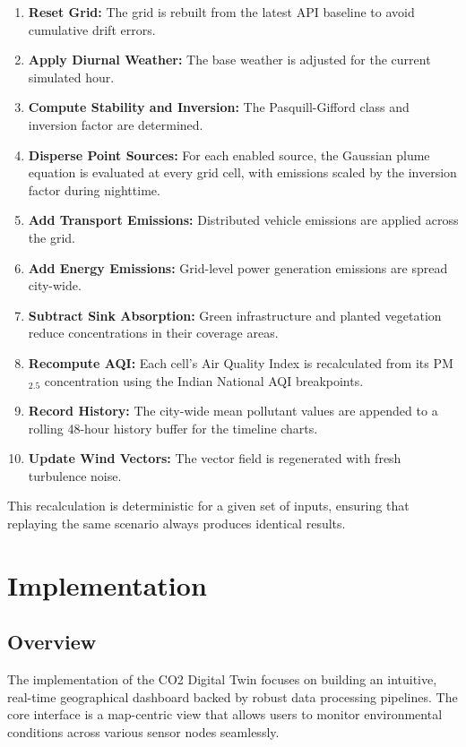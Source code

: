 \documentclass[a4paper, 12pt]{report}
\begin{document}
\begin{enumerate}
\item \textbf{Reset Grid:} The grid is rebuilt from the latest API baseline to avoid cumulative drift errors.
\item \textbf{Apply Diurnal Weather:} The base weather is adjusted for the current simulated hour.
\item \textbf{Compute Stability and Inversion:} The Pasquill-Gifford class and inversion factor are determined.
\item \textbf{Disperse Point Sources:} For each enabled source, the Gaussian plume equation is evaluated at every grid cell, with emissions scaled by the inversion factor during nighttime.
\item \textbf{Add Transport Emissions:} Distributed vehicle emissions are applied across the grid.
\item \textbf{Add Energy Emissions:} Grid-level power generation emissions are spread city-wide.
\item \textbf{Subtract Sink Absorption:} Green infrastructure and planted vegetation reduce concentrations in their coverage areas.
\item \textbf{Recompute AQI:} Each cell's Air Quality Index is recalculated from its PM$_{2.5}$ concentration using the Indian National AQI breakpoints.
\item \textbf{Record History:} The city-wide mean pollutant values are appended to a rolling 48-hour history buffer for the timeline charts.
\item \textbf{Update Wind Vectors:} The vector field is regenerated with fresh turbulence noise.
\end{enumerate}

This recalculation is deterministic for a given set of inputs, ensuring that replaying the same scenario always produces identical results.

\chapter{Implementation}
\section{Overview}
The implementation of the CO2 Digital Twin focuses on building an intuitive, real-time geographical dashboard backed by robust data processing pipelines. The core interface is a map-centric view that allows users to monitor environmental conditions across various sensor nodes seamlessly.
\end{document}
